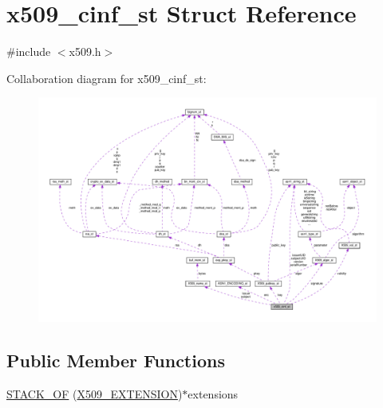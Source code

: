 \hypertarget{structx509__cinf__st}{}\section{x509\+\_\+cinf\+\_\+st Struct Reference}
\label{structx509__cinf__st}


{\ttfamily \#include $<$x509.\+h$>$}



Collaboration diagram for x509\+\_\+cinf\+\_\+st\+:
\nopagebreak
\begin{figure}[H]
\begin{center}
\leavevmode
\includegraphics[width=350pt]{structx509__cinf__st__coll__graph}
\end{center}
\end{figure}
\subsection*{Public Member Functions}
\begin{DoxyCompactItemize}
\item 
\hyperlink{structx509__cinf__st_a5b2aaa2ad972a8207194b43c4c043032}{S\+T\+A\+C\+K\+\_\+\+OF} (\hyperlink{x509_8h_ab2f7f7dc0ced8684e0cbfc818e408304}{X509\+\_\+\+E\+X\+T\+E\+N\+S\+I\+ON})$\ast$extensions
\end{DoxyCompactItemize}
